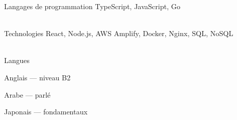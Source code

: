 

\begin{cvskills}

  \cvskill
  {Langages de programmation} %
  {TypeScript, JavaScript, Go} %

  \\

  \cvskill
  {Technologies} %
  {React, Node.js, AWS Amplify, Docker, Nginx, SQL, NoSQL}  %

  \\

  \cvskill
    {Langues} %
    {
      \begin{cvitems} %
        \item {Anglais — niveau B2}
        \item {Arabe — parlé}
        \item {Japonais — fondamentaux}
      \end{cvitems}
    }

\end{cvskills}
